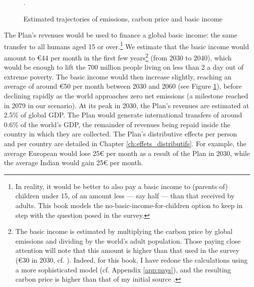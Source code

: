 \documentclass[a5paper,english,openany]{memoir}
\begin{document}
\begin{figure}[bh!]
  \caption[Trajectories (emissions, price, basic income)]{Estimated trajectories of emissions, carbon price and basic income}.\label{fig:trajectory}
\end{figure} 

The Plan's revenues would be used to finance a global basic income: the same transfer to all humans aged 15 or over.\footnote{In reality, it would be better to also pay a basic income to (parents of) children under 15, of an amount less --- say half --- than that received by adults. This book models the no-basic-income-for-children option to keep in step with the question posed in the survey.
} 
We estimate that the basic income would amount to \euro{}44 per month in the first few years\footnote{The basic income is estimated by multiplying the carbon price by global emissions and dividing by the world's adult population. Those paying close attention will note that this amount is higher than that used in the survey (\euro{}30 in 2030, cf. \citealp{fabre_global_2023}). Indeed, for this book, I have redone the calculations using a more sophisticated model (cf. Appendix \ref{app:pays}), and the resulting carbon price is higher than that of my initial source \citep{stern_report_2017}.} (from 2030 to 2040), which would be enough to lift the 700 million people living on less than \textit{\texteuro{}}2 a day out of extreme poverty. 
The basic income would then increase slightly, reaching an average of around \euro{}50 per month between 2030 and 2060 (see Figure \ref{fig:trajectory}), before declining rapidly as the world approaches zero net emissions (a milestone reached in 2079 in our scenario). 
At its peak in 2030, the Plan's revenues are estimated at 2.5\% of global GDP. The Plan would generate international transfers of around 0.6\% %
of the world's GDP, the remainder %
of revenues being repaid inside the country in which they are collected. 
The Plan's distributive effects per person and per country are detailed in Chapter \ref{ch:effets_distributifs}. 
For example, the average European %
would lose 25\euro{} per month as a result of the Plan in 2030, while the average Indian would gain 25\euro{} per month. %
\end{document}
